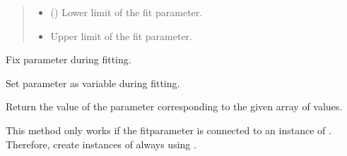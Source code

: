 \documentclass[letterpaper,10pt,english]{sphinxmanual}
\begin{document}
\begin{fulllineitems}
\begin{fulllineitems}
\begin{quote}
\begin{description}
\begin{itemize}
\item {} 
 () \textendash{} Lower limit of the fit parameter.

\item {} 
 \textendash{} Upper limit of the fit parameter.

\end{itemize}

\end{description}\end{quote}

\end{fulllineitems}


\begin{fulllineitems}
\label{\detokenize{modules-api/parameters:Parameters.Fitparameter.fix}}
Fix parameter during fitting.

\end{fulllineitems}


\begin{fulllineitems}
\label{\detokenize{modules-api/parameters:Parameters.Fitparameter.unfix}}
Set parameter as variable during fitting.

\end{fulllineitems}


\begin{fulllineitems}
\label{\detokenize{modules-api/parameters:Parameters.Fitparameter.getValue}}
Return the value of the parameter corresponding to the given array of values.

This method only works if the fitparameter is connected to an instance of {\hyperref[\detokenize{modules-api/parameters:Parameters.ParameterPool}]{}}.
Therefore, create instances of {\hyperref[\detokenize{modules-api/parameters:Parameters.Fitparameter}]{}} always using {\hyperref[\detokenize{modules-api/parameters:Parameters.ParameterPool.newParameter}]{}}.


\end{fulllineitems}
\end{fulllineitems}
\end{document}
